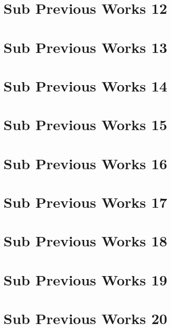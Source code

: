 \section{Sub Previous Works 12}
\section{Sub Previous Works 13}
\section{Sub Previous Works 14}
\section{Sub Previous Works 15}
\section{Sub Previous Works 16}
\section{Sub Previous Works 17}
\section{Sub Previous Works 18}
\section{Sub Previous Works 19}
\section{Sub Previous Works 20}